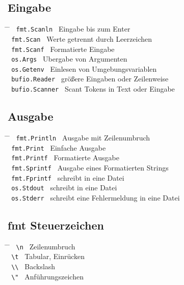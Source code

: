 \documentclass[twoside,a4paper,12pt]{article}
\begin{document}
\subsection{Eingabe}
\begin{tabbing}
  \hspace{2mm} \= \hspace{70mm} \= \kill
  \> \verb| fmt.Scanln | \> Eingabe bis zum Enter \\  
  \> \verb| fmt.Scan | \> Werte getrennt durch Leerzeichen \\ 
  \> \verb| fmt.Scanf | \> Formatierte Eingabe \\ 
  \> \verb| os.Args | \> Ubergabe von Argumenten \\ 
  \> \verb| os.Getenv | \> Einlesen von Umgebungsvariablen \\
  \> \verb| bufio.Reader | \> größere Eingaben oder Zeilenweise \\ 
  \> \verb| bufio.Scanner | \>  Scant Tokens in Text oder Eingabe \\
\end{tabbing}

\subsection{Ausgabe}
\begin{tabbing}
  \hspace{2mm} \= \hspace{70mm} \= \kill
  \> \verb| fmt.Println | \> Ausgabe mit Zeilenumbruch \\ 
  \> \verb| fmt.Print | \> Einfache Ausgabe \\ 
  \> \verb| fmt.Printf | \> Formatierte Ausgabe \\ 
  \> \verb| fmt.Sprintf | \> Ausgabe eines Formatierten Strings \\ 
  \> \verb| fmt.Fprintf | \> schreibt in eine Datei \\ 
  \> \verb| os.Stdout | \> schreibt in eine Datei \\ 
  \> \verb| os.Stderr | \> schreibt eine Fehlermeldung in eine Datei \\ 
\end{tabbing}

\subsection{fmt Steuerzeichen}
\begin{tabbing}
  \hspace{2mm} \= \hspace{70mm} \= \kill
  \> \verb| \n | \> Zeilenumbruch \\ 
  \> \verb| \t | \> Tabular, Einrücken \\ 
  \> \verb| \\ | \> Backslash \\ 
  \> \verb| \" | \> Anführungszeichen \\ 
\end{tabbing}
\end{document}
